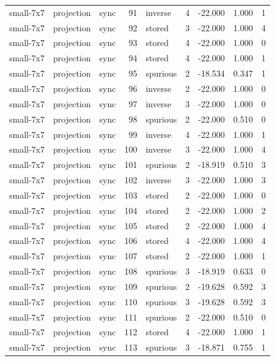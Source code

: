 \begin{tabular}{lllrlrrrr}
small-7x7 & projection & sync & 91 & inverse & 4 & -22.000 & 1.000 & 1 \\
small-7x7 & projection & sync & 92 & stored & 3 & -22.000 & 1.000 & 4 \\
small-7x7 & projection & sync & 93 & stored & 4 & -22.000 & 1.000 & 0 \\
small-7x7 & projection & sync & 94 & stored & 4 & -22.000 & 1.000 & 1 \\
small-7x7 & projection & sync & 95 & spurious & 2 & -18.534 & 0.347 & 1 \\
small-7x7 & projection & sync & 96 & inverse & 2 & -22.000 & 1.000 & 0 \\
small-7x7 & projection & sync & 97 & inverse & 3 & -22.000 & 1.000 & 0 \\
small-7x7 & projection & sync & 98 & spurious & 2 & -22.000 & 0.510 & 0 \\
small-7x7 & projection & sync & 99 & inverse & 4 & -22.000 & 1.000 & 1 \\
small-7x7 & projection & sync & 100 & inverse & 3 & -22.000 & 1.000 & 4 \\
small-7x7 & projection & sync & 101 & spurious & 2 & -18.919 & 0.510 & 3 \\
small-7x7 & projection & sync & 102 & inverse & 3 & -22.000 & 1.000 & 3 \\
small-7x7 & projection & sync & 103 & stored & 2 & -22.000 & 1.000 & 0 \\
small-7x7 & projection & sync & 104 & stored & 2 & -22.000 & 1.000 & 2 \\
small-7x7 & projection & sync & 105 & stored & 2 & -22.000 & 1.000 & 4 \\
small-7x7 & projection & sync & 106 & stored & 4 & -22.000 & 1.000 & 4 \\
small-7x7 & projection & sync & 107 & stored & 2 & -22.000 & 1.000 & 1 \\
small-7x7 & projection & sync & 108 & spurious & 3 & -18.919 & 0.633 & 0 \\
small-7x7 & projection & sync & 109 & spurious & 2 & -19.628 & 0.592 & 3 \\
small-7x7 & projection & sync & 110 & spurious & 3 & -19.628 & 0.592 & 3 \\
small-7x7 & projection & sync & 111 & spurious & 2 & -22.000 & 0.510 & 0 \\
small-7x7 & projection & sync & 112 & stored & 4 & -22.000 & 1.000 & 1 \\
small-7x7 & projection & sync & 113 & spurious & 3 & -18.871 & 0.755 & 1 \\

\end{tabular}
